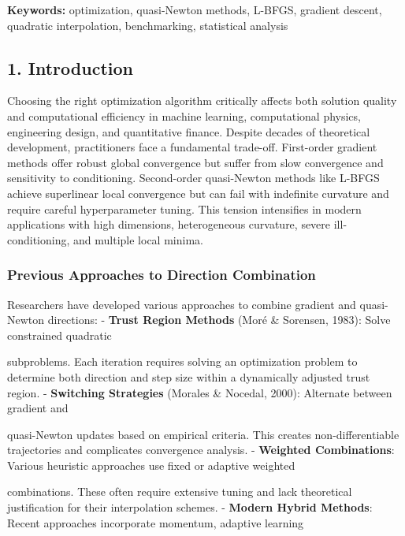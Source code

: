 \textbf{Keywords:} optimization, quasi-Newton methods, L-BFGS, gradient descent, quadratic interpolation, benchmarking,
statistical analysis

\hypertarget{introduction}{%
\subsection{1. Introduction}\label{introduction}}

Choosing the right optimization algorithm critically affects both solution quality and computational efficiency in
machine learning, computational physics, engineering design, and quantitative finance. Despite decades of theoretical
development, practitioners face a fundamental trade-off. First-order gradient methods offer robust global convergence
but suffer from slow convergence and sensitivity to conditioning. Second-order quasi-Newton methods like L-BFGS achieve
superlinear local convergence but can fail with indefinite curvature and require careful hyperparameter tuning. This
tension intensifies in modern applications with high dimensions, heterogeneous curvature, severe ill-conditioning, and
multiple local minima.

\hypertarget{previous-approaches-to-direction-combination}{%
\subsubsection{Previous Approaches to Direction Combination}\label{previous-approaches-to-direction-combination}}

Researchers have developed various approaches to combine gradient and quasi-Newton directions:
- \textbf{Trust Region Methods} (Moré \& Sorensen, 1983): Solve constrained quadratic

subproblems. Each iteration requires solving an optimization problem to determine both direction and step size within
a dynamically adjusted trust region.
- \textbf{Switching Strategies} (Morales \& Nocedal, 2000): Alternate between gradient and

quasi-Newton updates based on empirical criteria. This creates non-differentiable trajectories and complicates
convergence analysis.
- \textbf{Weighted Combinations}: Various heuristic approaches use fixed or adaptive weighted

combinations. These often require extensive tuning and lack theoretical justification for their interpolation schemes.
- \textbf{Modern Hybrid Methods}: Recent approaches incorporate momentum, adaptive learning

